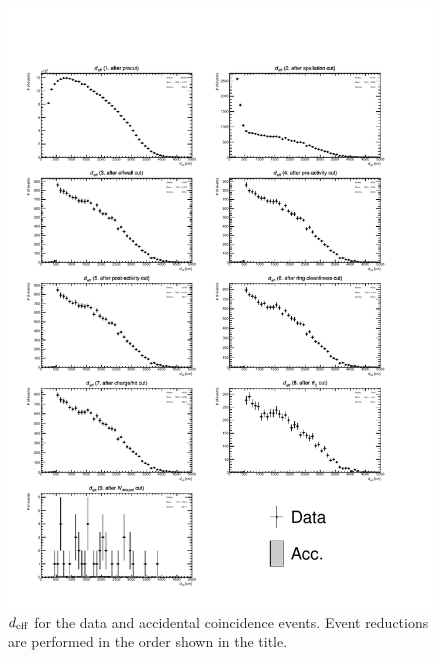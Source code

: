 \begin{figure}[h]
	\centering
	\includegraphics[width=15cm]{PDF/Dist_Data/Che_50deg_tag_ge1/effwall}
	\caption[$d_{\rm eff}$ for the data and accidental coincidence events]{
	$d_{\rm eff}$ for the data and accidental coincidence events.
	Event reductions are performed in the order shown in the title.
	}\label{Data_effwall}
\end{figure}

